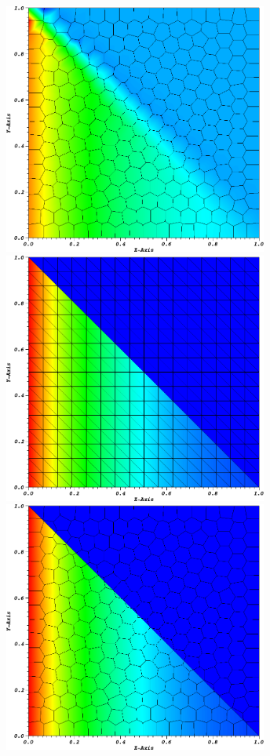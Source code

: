 \documentclass[compress,10pt]{beamer}
\begin{document}
\begin{frame}[t]
{\begin{columns}
{}\includegraphics[width=0.65\textwidth]{images/PALeftSol_Poly.png}
\centering
{}\includegraphics[width=0.65\textwidth]{images/PALeftSol_Tri.png} \\
{}\includegraphics[width=0.65\textwidth]{images/PALeftSol_SplitPoly.png}

\end{columns}}
\end{frame}
\end{document}
